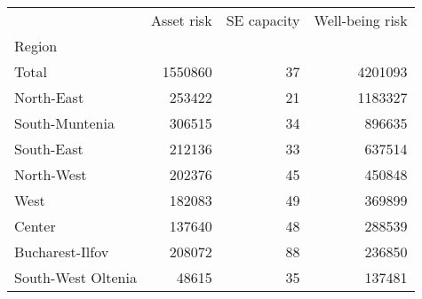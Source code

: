 \begin{tabular}{lrrr}
\toprule
{} &  Asset risk &  SE capacity &  Well-being risk \\
Region             &             &              &                  \\
\midrule
Total              &     1550860 &           37 &          4201093 \\
North-East         &      253422 &           21 &          1183327 \\
South-Muntenia     &      306515 &           34 &           896635 \\
South-East         &      212136 &           33 &           637514 \\
North-West         &      202376 &           45 &           450848 \\
West               &      182083 &           49 &           369899 \\
Center             &      137640 &           48 &           288539 \\
Bucharest-Ilfov    &      208072 &           88 &           236850 \\
South-West Oltenia &       48615 &           35 &           137481 \\
\bottomrule
\end{tabular}
